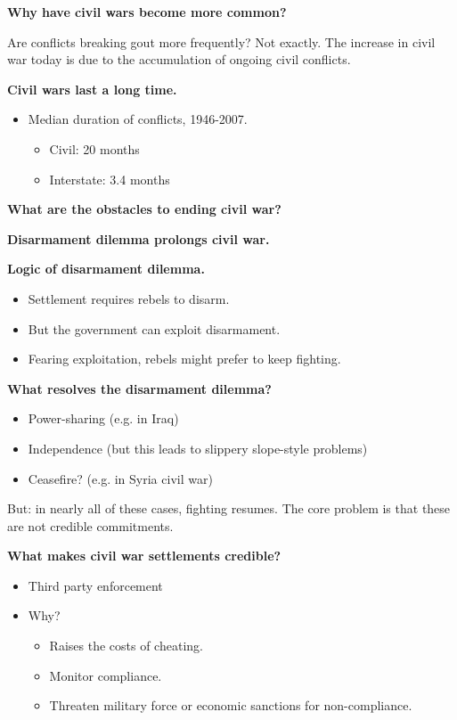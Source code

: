 \documentclass{article}
\begin{document}
{\bf Why have civil wars become more common?}

Are conflicts breaking gout more frequently?  Not exactly.  The increase in civil war today is due to the accumulation of ongoing civil conflicts.

{\bf Civil wars last a long time.}


\begin{itemize}
  \item Median duration of conflicts, 1946-2007.
    \begin{itemize}
      \item Civil: 20 months
      \item Interstate: 3.4 months
    \end{itemize}
\end{itemize}

{\bf What are the obstacles to ending civil war?}

{\bf Disarmament dilemma prolongs civil war.}

{\bf Logic of disarmament dilemma.}

\begin{itemize}
  \item Settlement requires rebels to disarm.
  \item But the government can exploit disarmament.
  \item Fearing exploitation, rebels might prefer to keep fighting.
\end{itemize}

{\bf What resolves the disarmament dilemma?}

\begin{itemize}
  \item Power-sharing (e.g. in Iraq)
  \item Independence (but this leads to slippery slope-style problems)
  \item Ceasefire? (e.g. in Syria civil war)
\end{itemize}

But: in nearly all of these cases, fighting resumes.  The core problem is that these are not credible commitments.

{\bf What makes civil war settlements credible?}

\begin{itemize}
  \item Third party enforcement
  \item Why?
    \begin{itemize}
      \item Raises the costs of cheating.
      \item Monitor compliance.
      \item Threaten military force or economic sanctions for non-compliance.
    \end{itemize}
\end{itemize}
\end{document}
